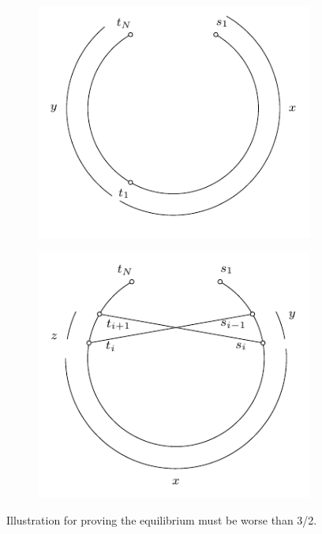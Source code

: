 \documentclass[11pt,psfig,times]{article}
\begin{document}
	\begin{figure}
		\begin{center}
			\begin{subfigure}[b]{0.3\textwidth}
				\includegraphics{pictures/lessthan3.pdf}
			\end{subfigure}
			\hspace{50pt}
			\begin{subfigure}[b]{0.3\textwidth}
				\includegraphics{pictures/lessthan3_2.pdf}
			\end{subfigure}
		\end{center}
		\caption{Illustration for proving the equilibrium must be worse than 3/2.}
		\label{fig:3/2equi}
	\end{figure}    
	
\end{document}
